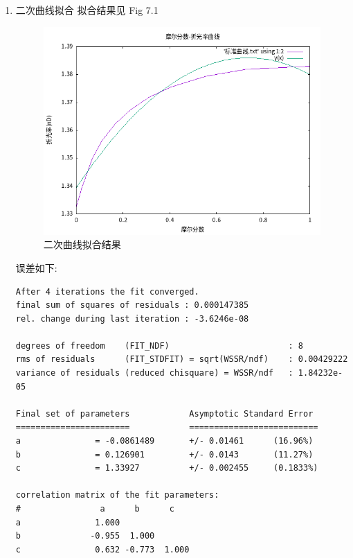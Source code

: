 \documentclass[11pt]{report}
\begin{document}
\begin{enumerate}
\item 二次曲线拟合
\label{sec:orgf3faba9}
拟合结果见 Fig 7.1
\begin{figure}[htbp]
\centering
\includegraphics[width=.9\linewidth]{../data/标准曲线-二次曲线拟合.png}
\caption{\label{fig:orgb569b4b}二次曲线拟合结果}
\end{figure}
误差如下:
\begin{verbatim}
After 4 iterations the fit converged.
final sum of squares of residuals : 0.000147385
rel. change during last iteration : -3.6246e-08

degrees of freedom    (FIT_NDF)                        : 8
rms of residuals      (FIT_STDFIT) = sqrt(WSSR/ndf)    : 0.00429222
variance of residuals (reduced chisquare) = WSSR/ndf   : 1.84232e-05

Final set of parameters            Asymptotic Standard Error
=======================            ==========================
a               = -0.0861489       +/- 0.01461      (16.96%)
b               = 0.126901         +/- 0.0143       (11.27%)
c               = 1.33927          +/- 0.002455     (0.1833%)

correlation matrix of the fit parameters:
#                a      b      c      
a               1.000 
b              -0.955  1.000 
c               0.632 -0.773  1.000 


\end{verbatim}
\end{enumerate}
\end{document}
